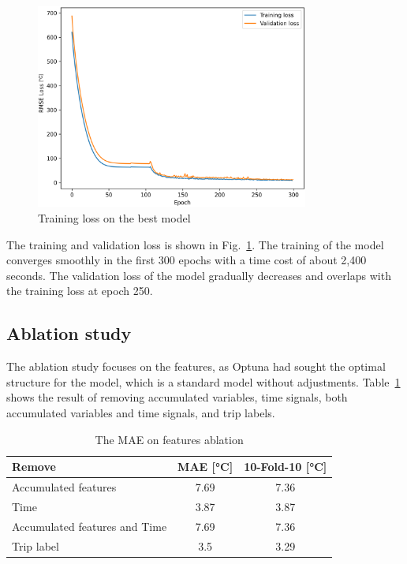 \begin{figure}[hbt]%
\begin {center}
\includegraphics[width=0.8\textwidth]{Chapter5/figures/lstm_loss_nodriver_temp.png}
\caption{Training loss on the best model}
\label{fig:lstm_loss}
\end {center}
\end{figure}

The training and validation loss is shown in Fig.~\ref{fig:lstm_loss}. 
The training of the model converges smoothly in the first 300 epochs with a time cost of about 2,400 seconds. 
The validation loss of the model gradually decreases and overlaps with the training loss at epoch 250.

\subsection{Ablation study}

The ablation study focuses on the features, as Optuna had sought the optimal structure for the model, which is a standard model without adjustments. 
Table~\ref{tab:ablation} shows the result of removing accumulated variables, time signals, both accumulated variables and time signals, and trip labels.

\begin{table}[hbt]
    \centering
    \caption{The \gls{MAE} on features ablation}
    \label{tab:ablation}
    \begin{tabular}{lcc}
    \toprule
        Remove & \gls{MAE} [°C] & 10-Fold-10 [°C]\\ 
        \midrule
        Accumulated features & 7.69 & 7.36 \\ 
        Time & 3.87 & 3.87 \\ 
        Accumulated features and Time & 7.69 & 7.36 \\
        Trip label & 3.5 & 3.29 \\
        \bottomrule
    \end{tabular}
\end{table}

